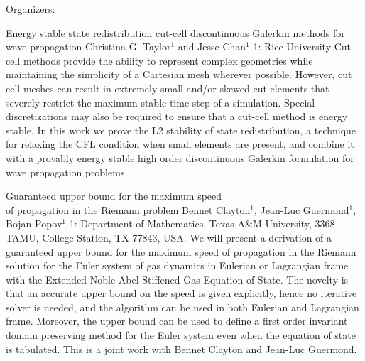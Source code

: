 \label{mini25}

\miniabs
{}
{Organizers: }
{}

\vspace{2ex}
\abs
{Energy stable state redistribution cut-cell discontinuous Galerkin methods for wave propagation}
{Christina G. Taylor$^{1}$ and Jesse Chan$^{1}$}
{1: Rice University}
{Cut cell methods provide the ability to represent complex geometries while maintaining the simplicity of a Cartesian mesh wherever possible. However, cut cell meshes can result in extremely small and/or skewed cut elements that severely restrict the maximum stable time step of a simulation. Special discretizations may also be required to ensure that a cut-cell method is energy stable. In this work we prove the L2 stability of state redistribution, a technique for relaxing the CFL condition when small elements are present, and combine it with a provably energy stable high order discontinuous Galerkin formulation for wave propagation problems.}


\vspace{1.5ex}
\abs
{Guaranteed upper bound for the maximum speed\\ of propagation in the Riemann problem}
{Bennet Clayton$^1$, Jean-Luc Guermond$^1$, Bojan Popov$^1$}
{1: Department of Mathematics, Texas A\&M University, 3368 TAMU, College Station, TX 77843, USA.}
{We will present a derivation of a guaranteed upper bound for the maximum speed of propagation in the Riemann solution for the Euler system of gas dynamics in Eulerian or Lagrangian frame with the Extended Noble-Abel Stiffened-Gas Equation of State. The novelty is that an accurate upper bound on the speed is given explicitly, hence no iterative solver is needed, and the algorithm can be used in both Eulerian and Lagrangian frame. Moreover, the upper bound can be used to define a first order invariant domain preserving method for the Euler system even when the equation of state is tabulated. 	This is a joint work with Bennet Clayton and Jean-Luc Guermond.}


